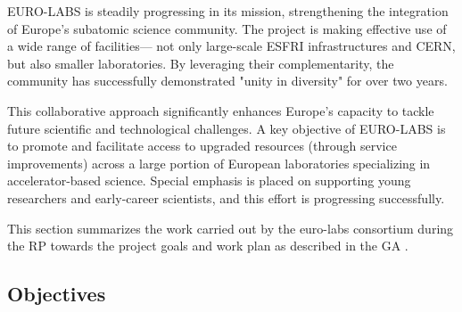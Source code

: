 EURO-LABS is steadily progressing in its mission, strengthening the integration of Europe’s subatomic science community. The project is making effective use of a wide range of facilities— not only large-scale ESFRI infrastructures and CERN, but also smaller laboratories. By leveraging their complementarity, the community has successfully demonstrated "unity in diversity" for over two years.

This collaborative approach significantly enhances Europe’s capacity to tackle future scientific and technological challenges. A key objective of EURO-LABS is to promote and facilitate access to upgraded resources (through service improvements) across a large portion of European laboratories specializing in accelerator-based science. Special emphasis is placed on supporting young researchers and early-career scientists, and this effort is progressing successfully.

This section summarizes the work carried out by the \acrshort{euro-labs} consortium during the  \acrshort{RP} towards the project goals and work plan as described in the \acrfull{GA} \cite{bib:grantagreement2020}.

\subsection{Objectives}

